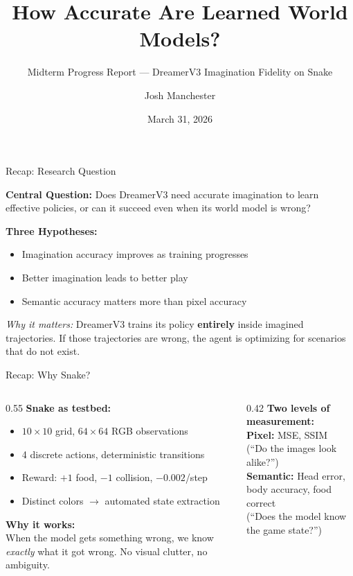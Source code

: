 \documentclass[aspectratio=169]{beamer}
\title{How Accurate Are Learned World Models?}
\subtitle{Midterm Progress Report --- DreamerV3 Imagination Fidelity on Snake}
\author{Josh Manchester}
\institute{CS 5080 --- Reinforcement Learning \\ University of Colorado Colorado Springs}
\date{March 31, 2026}
\begin{document}
\begin{frame}
\titlepage
\end{frame}

\begin{frame}{Recap: Research Question}

\textbf{Central Question:} Does DreamerV3 need accurate imagination to learn effective policies, or can it succeed even when its world model is wrong?

\vspace{1em}
\textbf{Three Hypotheses:}
\begin{itemize}
    \item[\textbf{H1:}] Imagination accuracy improves as training progresses
    \item[\textbf{H2:}] Better imagination leads to better play
    \item[\textbf{H3:}] Semantic accuracy matters more than pixel accuracy
\end{itemize}

\vspace{1em}
\textit{Why it matters:} DreamerV3 trains its policy \textbf{entirely} inside imagined trajectories. If those trajectories are wrong, the agent is optimizing for scenarios that do not exist.
\end{frame}

\begin{frame}{Recap: Why Snake?}

\begin{columns}
\begin{column}{0.55\textwidth}
\textbf{Snake as testbed:}
\begin{itemize}
    \item $10 \times 10$ grid, $64 \times 64$ RGB observations
    \item 4 discrete actions, deterministic transitions
    \item Reward: $+1$ food, $-1$ collision, $-0.002$/step
    \item Distinct colors $\rightarrow$ automated state extraction
\end{itemize}

\vspace{0.5em}
\textbf{Why it works:}\\
When the model gets something wrong, we know \textit{exactly} what it got wrong. No visual clutter, no ambiguity.
\end{column}
\begin{column}{0.42\textwidth}
\textbf{Two levels of measurement:}\\[0.5em]
\textbf{Pixel:} MSE, SSIM\\
(``Do the images look alike?'')\\[0.5em]
\textbf{Semantic:} Head error, body accuracy, food correct\\
(``Does the model know the game state?'')
\end{column}
\end{columns}
\end{frame}
\end{document}
